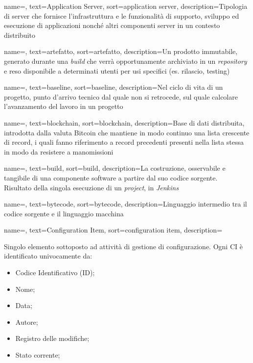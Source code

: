 {
    name=,
    text=Application Server,
    sort=application server,
    description={Tipologia di server che fornisce l'infrastruttura e le funzionalità di supporto, sviluppo ed esecuzione di applicazioni nonché altri componenti server in un contesto distribuito}
}

{
    name=,
    text=artefatto,
    sort=artefatto,
    description={Un prodotto immutabile, generato durante una \textit{build} che verrà opportunamente archiviato in un \textit{repository} e reso disponibile a determinati utenti per usi specifici (es. rilascio, testing)}
}

{
    name=,
    text=baseline,
    sort=baseline,
    description={Nel ciclo di vita di un progetto, punto d'arrivo tecnico dal quale non si retrocede, sul quale calcolare l'avanzamento del lavoro in un progetto}
}

{
    name=,
    text=blockchain,
    sort=blockchain,
    description={Base di dati distribuita, introdotta dalla valuta Bitcoin che mantiene in modo continuo una lista crescente di record, i quali fanno riferimento a record precedenti presenti nella lista stessa in modo da resistere a manomissioni}
}

{
    name=,
    text=build,
    sort=build,
    description={La costruzione, osservabile e tangibile di una componente software a partire dal suo codice sorgente.\\ 
    Risultato della singola esecuzione di un \textit{project}, in \textit{Jenkins}}
}

{
    name=,
    text=bytecode,
    sort=bytecode,
    description={Linguaggio intermedio tra il codice sorgente e il linguaggio macchina}
}

{
    name=,
    text=Configuration Item,
    sort=configuration item,
    description={Singolo elemento sottoposto ad attività di gestione di configurazione. Ogni CI è identificato univocamente da:
        \begin{itemize}
            \item Codice Identificativo (ID);
            \item Nome;
            \item Data;
            \item Autore;
            \item Registro delle modifiche;
            \item Stato corrente;
        \end{itemize}}
}

